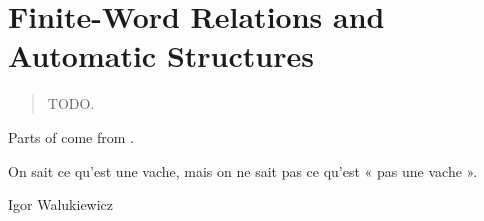 \chapter{Finite-Word Relations and Automatic Structures}
\label{ch:preliminaries-automatic-structures}

\begin{chapterpresentation}
	\begin{abstract}
		TODO.
	\end{abstract}
	\medskip
	\begin{acknowledgements}
		Parts of 
		come from \cite[\S~1]{Morvan2024Algebras}.
	\end{acknowledgements}
\end{chapterpresentation}
	
\chaptertoc

\epigraph{On sait ce qu'est une vache, mais on ne sait pas ce qu'est « pas une vache ».}{Igor Walukiewicz}



